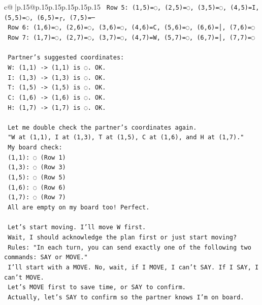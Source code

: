\documentclass{article}
\begin{document}
{\begin{supertabular}{c@{$\;$}|p{.15\linewidth}@{}p{.15\linewidth}p{.15\linewidth}p{.15\linewidth}p{.15\linewidth}p{.15\linewidth}}
{{{\texttt{        Row 5: (1,5)=◌, (2,5)=◌, (3,5)=◌, (4,5)=I, (5,5)=◌, (6,5)=┌, (7,5)=─} \\
\texttt{        Row 6: (1,6)=◌, (2,6)=◌, (3,6)=◌, (4,6)=C, (5,6)=◌, (6,6)=│, (7,6)=◌} \\
\texttt{        Row 7: (1,7)=◌, (2,7)=◌, (3,7)=◌, (4,7)=W, (5,7)=◌, (6,7)=│, (7,7)=◌} \\
\\ 
\texttt{        Partner's suggested coordinates:} \\
\texttt{        W: (1,1) {-}> (1,1) is ◌. OK.} \\
\texttt{        I: (1,3) {-}> (1,3) is ◌. OK.} \\
\texttt{        T: (1,5) {-}> (1,5) is ◌. OK.} \\
\texttt{        C: (1,6) {-}> (1,6) is ◌. OK.} \\
\texttt{        H: (1,7) {-}> (1,7) is ◌. OK.} \\
\\ 
\texttt{        Let me double check the partner's coordinates again.} \\
\texttt{        "W at (1,1), I at (1,3), T at (1,5), C at (1,6), and H at (1,7)."} \\
\texttt{        My board check:} \\
\texttt{        (1,1): ◌ (Row 1)} \\
\texttt{        (1,3): ◌ (Row 3)} \\
\texttt{        (1,5): ◌ (Row 5)} \\
\texttt{        (1,6): ◌ (Row 6)} \\
\texttt{        (1,7): ◌ (Row 7)} \\
\texttt{        All are empty on my board too! Perfect.} \\
\\ 
\texttt{        Let's start moving. I'll move W first.} \\
\texttt{        Wait, I should acknowledge the plan first or just start moving?} \\
\texttt{        Rules: "In each turn, you can send exactly one of the following two commands: SAY or MOVE."} \\
\texttt{        I'll start with a MOVE. No, wait, if I MOVE, I can't SAY. If I SAY, I can't MOVE.} \\
\texttt{        Let's MOVE first to save time, or SAY to confirm.} \\
\texttt{        Actually, let's SAY to confirm so the partner knows I'm on board.} \\
}}}
\end{supertabular}}
\end{document}
